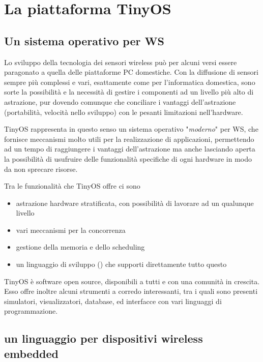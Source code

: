 \documentclass[twoside,11pt,a4paper,italian,openany]{book}
\begin{document}
\chapter{La piattaforma TinyOS}

\section{Un sistema operativo per WS}
Lo sviluppo della tecnologia dei sensori wireless può per alcuni versi 
essere paragonato a quella delle piattaforme PC domestiche. 
Con la diffusione di sensori sempre più complessi e vari, esattamente come per 
l'informatica domestica, sono sorte la possibilità e la necessità di gestire i
componenti ad un livello più alto di astrazione, pur dovendo comunque che conciliare 
i vantaggi dell'astrazione (portabilità, velocità nello sviluppo) con le pesanti 
limitazioni nell'hardware. 

TinyOS\cite{tinyos} rappresenta in questo senso un sistema operativo "\emph{moderno}" per WS, 
che fornisce meccanismi molto utili per la realizzazione di applicazioni, permettendo 
ad un tempo di raggiungere i vantaggi dell'astrazione ma anche lasciando aperta la possibilità 
di usufruire delle funzionalità specifiche di ogni hardware in modo da non sprecare risorse. 

Tra le funzionalità che TinyOS offre ci sono
\begin{itemize}

\item{astrazione hardware stratificata, con possibilità di lavorare ad un qualunque livello}

\item{vari meccanismi per la concorrenza }

\item{gestione della memoria e dello scheduling}

\item{un linguaggio di sviluppo (\nesc) che supporti direttamente tutto questo}
\end{itemize}

TinyOS è software open source, disponibili a tutti  e con una comunità in crescita.
Esso offre inoltre alcuni strumenti a corredo interessanti, tra i quali sono presenti 
simulatori, visualizzatori, database, ed interfacce con vari linguaggi di programmazione. 


\section{\nesc un linguaggio per dispositivi wireless embedded}
\end{document}
